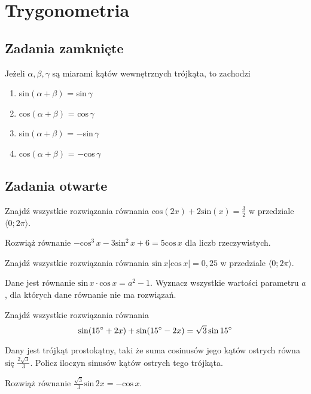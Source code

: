 \setcounter{parc}{0}
\addtocounter{chapc}{1}

\chapter{Trygonometria}

\section{Zadania zamknięte}

\zadanie Jeżeli $\alpha, \beta, \gamma$ są miarami kątów wewnętrznych trójkąta, to zachodzi
\begin{enumerate}[label=\alph*)]
	\item sin$(\alpha + \beta)$ = sin\,$\gamma$ %
	\item cos$(\alpha + \beta)$ = cos\,$\gamma$
	\item sin$(\alpha + \beta)$ = $-$sin\,$\gamma$
	\item cos$(\alpha + \beta)$ = $-$cos\,$\gamma$
\end{enumerate}

\section{Zadania otwarte}

\zadanie Znajdź wszystkie rozwiązania równania $\text{cos}(2x) + 2\text{sin}(x) = \frac{3}{2}$ w przedziale $\langle 0; 2\pi \rangle$.

\zadanie Rozwiąż równanie $-\text{cos}^3\,x -3\text{sin}^2\,x + 6 = 5\text{cos}\,x$ dla liczb rzeczywistych.

\zadanie Znajdź wszystkie rozwiązania równania $\text{sin}\, x|\text{cos}\,x| = 0,25$ w przedziale $\langle 0; 2\pi \rangle$.

\zadanie Dane jest równanie $\text{sin}\,x\cdot\text{cos}\,x = a^2 - 1$. Wyznacz wszystkie wartości parametru $a$, dla których dane równanie nie ma rozwiązań.

\zadanie Znajdź wszystkie rozwiązania równania \[ \sin(15^{\circ}+2x) + \sin(15^{\circ}-2x) = \sqrt{3}\sin15^{\circ} \]

\zadanie Dany jest trójkąt prostokątny, taki że suma cosinusów jego kątów ostrych równa się $\frac{2\sqrt{3}}{3}$. Policz iloczyn sinusów kątów ostrych tego trójkąta.

\zadanie Rozwiąż równanie $ \frac{\sqrt{3}}{3}\text{sin}\,2x = -\text{cos}\,x $. 

